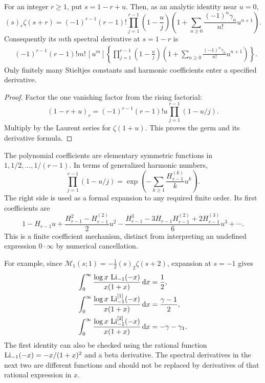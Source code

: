 \begin{proposition}\label{mld:prop:spectral-cancellation}
For an integer $r\ge1$, put $s=1-r+u$. Then, as an analytic identity near $u=0$,
\begin{equation}\label{mld:eq:cancelled-zeta-germ}
 (s)_r\zeta(s+r)=(-1)^{r-1}(r-1)!
       \prod_{j=1}^{r-1}\left(1-\frac uj\right)
       \left(1+\sum_{n\ge0}\frac{(-1)^n\gamma_n}{n!}u^{n+1}\right).
\end{equation}
Consequently its $m$th spectral derivative at $s=1-r$ is
\begin{align}\label{mld:eq:cancelled-zeta-derivative}
 &(-1)^{r-1}(r-1)!m!\,[u^m]
       \left\{\prod_{j=1}^{r-1}\left(1-\frac uj\right)
       \left(1+\sum_{n\ge0}\frac{(-1)^n\gamma_n}{n!}u^{n+1}\right)\right\}.
\end{align}
Only finitely many Stieltjes constants and harmonic coefficients enter a specified derivative.
\end{proposition}
\begin{proof}
Factor the one vanishing factor from the rising factorial:
\[
 (1-r+u)_r=(-1)^{r-1}(r-1)!u
                         \prod_{j=1}^{r-1}(1-u/j).
\]
Multiply by the Laurent series for $\zeta(1+u)$. This proves the germ and its derivative formula.
\end{proof}

The polynomial coefficients are elementary symmetric functions in
$1,1/2,\ldots,1/(r-1)$. In terms of generalized harmonic numbers,
\[
 \prod_{j=1}^{r-1}(1-u/j)
 =\exp\!\left(-\sum_{k\ge1}\frac{H_{r-1}^{(k)}}{k}u^k\right).
\]
The right side is used as a formal expansion to any required finite order. Its first coefficients are
\[
 1-H_{r-1}u+
 \frac{H_{r-1}^2-H_{r-1}^{(2)}}2u^2
 -\frac{H_{r-1}^3-3H_{r-1}H_{r-1}^{(2)}+2H_{r-1}^{(3)}}6u^3+\cdots.
\]
This is a finite coefficient mechanism, distinct from interpreting an undefined expression $0\cdot\infty$ by numerical cancellation.

For example, since
$\mathcal M_1(s;1)=-\tfrac12(s)_2\zeta(s+2)$,
expansion at $s=-1$ gives
\begin{align}
 \int_0^\infty\frac{\log x\,\operatorname{Li}_{-1}(-x)}{x(1+x)}\,\mathrm{d} x
      &=\frac12,\label{mld:eq:resonant-example0}\\
 \int_0^\infty\frac{\log x\,\operatorname{Li}_{-1}^{[1]}(-x)}{x(1+x)}\,\mathrm{d} x
      &=\frac{\gamma-1}{2},\label{mld:eq:resonant-example1}\\
 \int_0^\infty\frac{\log x\,\operatorname{Li}_{-1}^{[2]}(-x)}{x(1+x)}\,\mathrm{d} x
      &=-\gamma-\gamma_1.\label{mld:eq:resonant-example2}
\end{align}
The first identity can also be checked using the rational function
$\operatorname{Li}_{-1}(-x)=-x/(1+x)^2$ and a beta derivative. The spectral derivatives in the next two are different functions and should not be replaced by derivatives of that rational expression in $x$.

